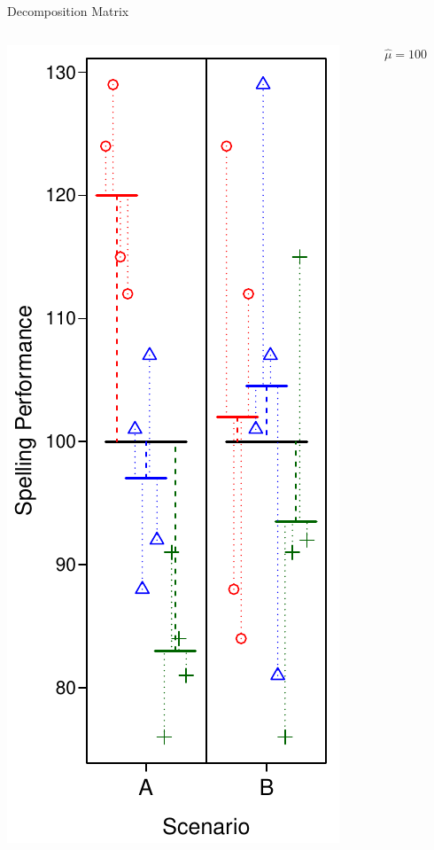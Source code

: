 \documentclass[presentation]{beamer}
\begin{document}
\begin{frame}[label={sec:org79855a1}]{Decomposition Matrix}
\begin{columns}
\begin{column}{.25\columnwidth}
\includegraphics[scale=.5]{08_glm_img/spelling-05.pdf}
\end{column}

\begin{column}{.75\columnwidth}
\begin{center}
\begin{scriptsize}
$\hat{\mu}=100$


\end{scriptsize}
\end{center}
\end{column}
\end{columns}
\end{frame}
\end{document}
